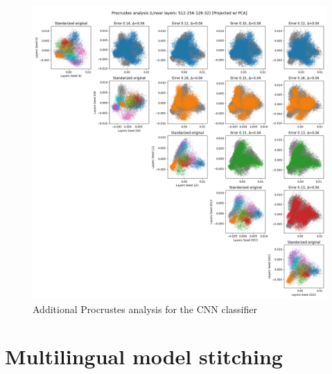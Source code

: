 \documentclass[../main.tex]{subfiles}
\begin{document}
\begin{figure}[ht!]
    \centering
    \includegraphics[width=\textwidth]{figures/rs/sim_cls/procrustes_512-256-128-32__42_200_121_2013_2023.png} 
    \caption{Additional Procrustes analysis for the CNN classifier}
    \label{fig:extra_proc_cls}
\end{figure}
%
\FloatBarrier
%
\section{Multilingual model stitching}
\end{document}
